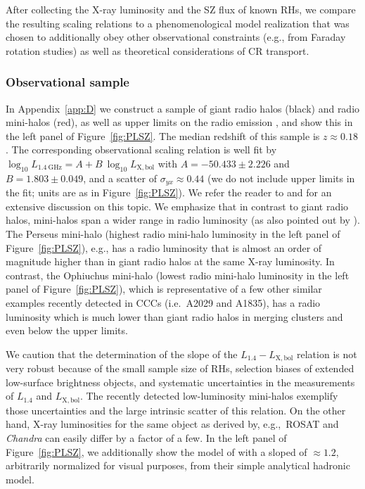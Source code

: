 \documentclass[traditabstract]{aa}
\newcommand{\rmn}{\mathrm}
\begin{document}
After collecting the X-ray luminosity and the SZ flux of known RHs, we compare
the resulting scaling relations to a phenomenological model realization that was
chosen to additionally obey other observational constraints (e.g., from Faraday
rotation studies) as well as theoretical considerations of CR transport.


\subsubsection{Observational sample}

In Appendix~\ref{app:D} we construct a sample of giant
radio halos (black) and radio mini-halos (red), as well as upper limits on the
radio emission \citep{2009A&A...507..661B, 2011A&A...527A..99E,
  2009A&A...499..371G}, and show this in the left panel of
Figure~\ref{fig:PLSZ}. The median redshift of this sample is $z\approx0.18$. The
corresponding observational scaling relation is well fit by $\log_{10}
L_{1.4~\rmn{GHz}} = A + B~\log_{10} L_{\rmn{X,bol}}$ with $A=-50.433\pm2.226$
and $B=1.803\pm0.049$, and a scatter of $\sigma_{yx} \approx 0.44$ (we do not
include upper limits in the fit; units are as in Figure~\ref{fig:PLSZ}). We
refer the reader to \cite{2009A&A...507..661B} and \cite{2011A&A...527A..99E}
for an extensive discussion on this topic. We emphasize that in contrast to
giant radio halos, mini-halos span a wider range in radio luminosity (as also
pointed out by \citealp{2009A&A...499..679M}). The Perseus mini-halo (highest radio
mini-halo luminosity in the left panel of Figure~\ref{fig:PLSZ}), e.g., has a
radio luminosity that is almost an order of magnitude higher than in giant radio
halos at the same X-ray luminosity. In contrast, the Ophiuchus mini-halo (lowest
radio mini-halo luminosity in the left panel of Figure~\ref{fig:PLSZ}), which is
representative of a few other similar examples recently detected in CCCs
(i.e.~A2029 and A1835), has a radio luminosity which is much lower than giant
radio halos in merging clusters and even below the upper limits. 

We caution that the determination of the slope of the $L_{1.4}-L_{\rmn{X,bol}}$
relation is not very robust because of the small sample size of RHs, selection
biases of extended low-surface brightness objects, and systematic uncertainties
in the measurements of $L_{1.4}$ and $L_{\rmn{X,bol}}$. The recently detected
low-luminosity mini-halos exemplify those uncertainties and the large intrinsic
scatter of this relation. On the other hand, X-ray luminosities for the same
object as derived by, e.g.,~ROSAT and \emph{Chandra} can easily differ by a
factor of a few. In the left panel of Figure~\ref{fig:PLSZ}, we additionally
show the model of \citet{2009JCAP...09..024K} with a sloped of $\approx1.2$,
arbitrarily normalized for visual purposes, from their simple analytical
hadronic model.
\end{document}
